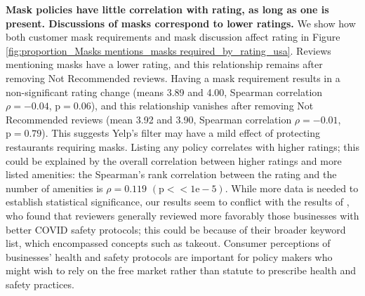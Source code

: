 \textbf{Mask policies have little correlation with rating, as long as one is present. Discussions of masks correspond to lower ratings.} We show how both customer mask requirements and mask discussion affect rating in Figure \ref{fig:proportion_Masks mentions_masks required_by_rating_usa}. Reviews mentioning masks have a lower rating, and this relationship remains after removing Not Recommended reviews. Having a mask requirement results in a non-significant rating change (means 3.89 and 4.00, Spearman correlation $\rho = -0.04$, $\text{p}=0.06$), and this relationship vanishes after removing Not Recommended reviews (mean 3.92 and 3.90, Spearman correlation $\rho = -0.01$, $\text{p}=0.79$). This suggests Yelp's filter may have a mild effect of protecting restaurants requiring masks. Listing any policy correlates with higher ratings; this could be explained by the overall correlation between higher ratings and more listed amenities: the Spearman's rank correlation between the rating and the number of amenities is $\rho=0.119$ $(\text{p}<<1\text{e}-5)$. While more data is needed to establish statistical significance, our results seem to conflict with the results of \citet{kostromitina2021his}, who found that reviewers generally reviewed more favorably those businesses with better COVID safety protocols; this could be because of their broader keyword list, which encompassed concepts such as takeout. Consumer perceptions of businesses' health and safety protocols are important for policy makers who might wish to rely on the free market rather than statute to prescribe health and safety practices.



